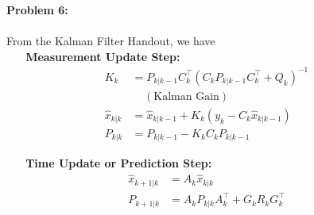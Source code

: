 \documentclass[letterpaper]{article}
\begin{document}
\newpage
\noindent \textbf{Problem 6:} \\

~~~~~~~~~~~~~~~~~~~~~~~~~~~~~~~~\\

\vspace*{1cm}
From the Kalman Filter Handout, we have\\

\textbf{~~~Measurement Update Step:}
\begin{align*}
K_k &= P_{k|k-1}C_k^\top \left(C_k P_{k|k-1} C_k^\top + Q_k\right)^{-1} \\
& ~~~~~(\text{Kalman Gain})\\
\widehat{x}_{k|k} &= \widehat{x}_{k|k-1}  + K_k \left( y_k - C_k \widehat{x}_{k|k-1} \right) \\
P_{k|k} &= P_{k|k-1} - K_k C_k  P_{k|k-1}
\end{align*}

\textbf{~~~Time Update or Prediction Step:}
\begin{align*}
\widehat{x}_{k+1|k} &= A_k \widehat{x}_{k|k}  \\
P_{k+1|k} &= A_k P_{k|k} A_k^\top + G_k R_k G_k^\top
\end{align*}
\end{document}
